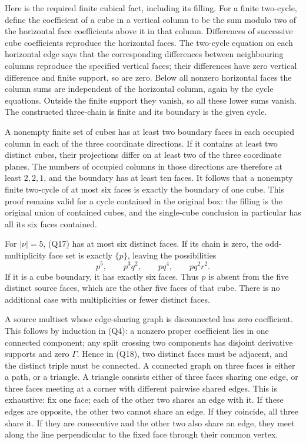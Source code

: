 \documentclass[11pt]{article}
\begin{document}
Here is the required finite cubical fact, including its filling. For a finite two-cycle, define the coefficient of a cube in a vertical column to be the sum modulo two of the horizontal face coefficients above it in that column. Differences of successive cube coefficients reproduce the horizontal faces. The two-cycle equation on each horizontal edge says that the corresponding differences between neighbouring columns reproduce the specified vertical faces; their differences have zero vertical difference and finite support, so are zero. Below all nonzero horizontal faces the column sums are independent of the horizontal column, again by the cycle equations. Outside the finite support they vanish, so all these lower sums vanish. The constructed three-chain is finite and its boundary is the given cycle.

A nonempty finite set of cubes has at least two boundary faces in each occupied column in each of the three coordinate directions. If it contains at least two distinct cubes, their projections differ on at least two of the three coordinate planes. The numbers of occupied columns in those directions are therefore at least \(2,2,1\), and the boundary has at least ten faces. It follows that a nonempty finite two-cycle of at most six faces is exactly the boundary of one cube. This proof remains valid for a cycle contained in the original box: the filling is the original union of contained cubes, and the single-cube conclusion in particular has all its six faces contained.

For \(|\nu|=5\), (Q17) has at most six distinct faces. If its chain is zero, the odd-multiplicity face set is exactly \(\{p\}\), leaving the possibilities
\[
 p^5,\qquad p^3q^2,\qquad pq^4,\qquad pq^2r^2.
 \tag{Q18}
\]
If it is a cube boundary, it has exactly six faces. Thus \(p\) is absent from the five distinct source faces, which are the other five faces of that cube. There is no additional case with multiplicities or fewer distinct faces.

A source multiset whose edge-sharing graph is disconnected has zero coefficient. This follows by induction in (Q4): a nonzero proper coefficient lies in one connected component; any split crossing two components has disjoint derivative supports and zero \(\Gamma\). Hence in (Q18), two distinct faces must be adjacent, and the distinct triple must be connected. A connected graph on three faces is either a path, or a triangle. A triangle consists either of three faces sharing one edge, or three faces meeting at a corner with different pairwise shared edges. This is exhaustive: fix one face; each of the other two shares an edge with it. If these edges are opposite, the other two cannot share an edge. If they coincide, all three share it. If they are consecutive and the other two also share an edge, they meet along the line perpendicular to the fixed face through their common vertex.
\end{document}
